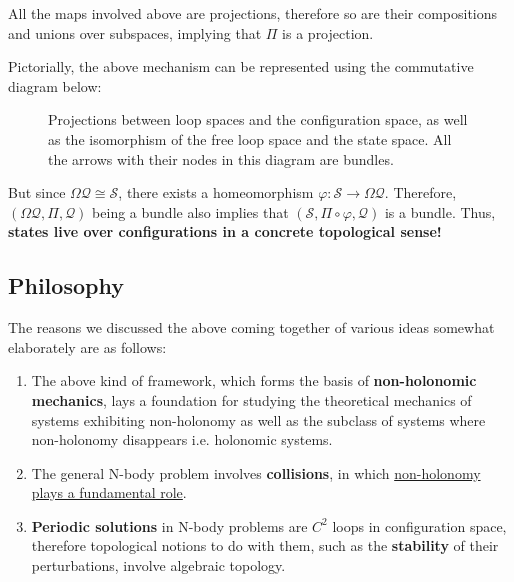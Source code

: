 \documentclass[oneside]{book}
\newcommand{\harp}{\overset{\rightharpoonup}}
\begin{document}
All the maps involved above are projections, therefore so are their compositions and unions over subspaces, implying that $\Pi$ is a projection.

Pictorially, the above mechanism can be represented using the commutative diagram below:

\begin{figure}[H]
\begin{center}
\end{center}
\caption{Projections between loop spaces and the configuration space, as well as the isomorphism of the free loop space and the state space. All the arrows with their nodes in this diagram are bundles.}
\end{figure}

But since $\Omega \mathcal{Q} \cong \mathcal{S}$, there exists a homeomorphism $\varphi : \mathcal{S} \to \Omega \mathcal{Q}$. Therefore, $(\Omega \mathcal{Q}, \Pi, \mathcal{Q})$ being a bundle also implies that $(\mathcal{S}, \Pi \circ \varphi, \mathcal{Q})$ is a bundle. Thus, \textbf{states live over configurations in a concrete topological sense!}

\subsection{Philosophy}

The reasons we discussed the above coming together of various ideas somewhat elaborately are as follows:

\begin{enumerate}
\item The above kind of framework, which forms the basis of \textbf{non-holonomic mechanics}, lays a foundation for studying the theoretical mechanics of systems exhibiting non-holonomy as well as the subclass of systems where non-holonomy disappears i.e. holonomic systems.

\item The general N-body problem involves \textbf{collisions}, in which \hyperref[avoiding_collisions]{non-holonomy plays a fundamental role}.

\item \textbf{Periodic solutions} in N-body problems are $C^2$ loops in configuration space, therefore topological notions to do with them, such as the \textbf{stability} of their perturbations, involve algebraic topology.
\end{enumerate}
\end{document}
